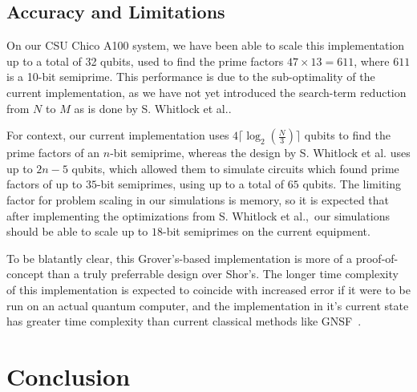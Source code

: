 \documentclass[twocolumn]{cinc}
\begin{document}
  \subsection{Accuracy and Limitations}

  On our CSU Chico A100 system, 
  we have been able to scale this implementation up to a total of 32 qubits,
  used to find the prime factors $47\times13=611$, where $611$ is a 10-bit semiprime. This
  performance is due to the sub-optimality of the current implementation, as we have
  not yet introduced the search-term reduction from $N$ to $M$ as is done by S. Whitlock 
  et al.\cite{quantum_factoring}. 

  For context, our current implementation uses $4 \lceil \log_2(\frac{N}{3})\rceil$ qubits
  to find the prime factors of an $n$-bit semiprime, whereas the design by S. Whitlock 
  et al.\cite{quantum_factoring} uses up to $2n-5$ qubits, which allowed them to simulate circuits which found
  prime factors of up to $35$-bit semiprimes, using up to a total of $65$ qubits. 
  The limiting factor for problem scaling in our simulations is memory, so it is expected that after implementing 
  the optimizations from S. Whitlock et al.,\ our simulations should be able to scale up to 
  $18$-bit semiprimes on the current equipment.

  To be blatantly clear, this Grover's-based implementation is more of a proof-of-concept than
  a truly preferrable design over Shor's. The longer time complexity of this implementation
  is expected to coincide with increased error if it were to be run on an actual quantum computer,
  and the implementation in it's current state has greater time complexity than current classical
  methods like GNSF~\cite{Bai2016,quantum_factoring}.

\section{Conclusion}
\end{document}
